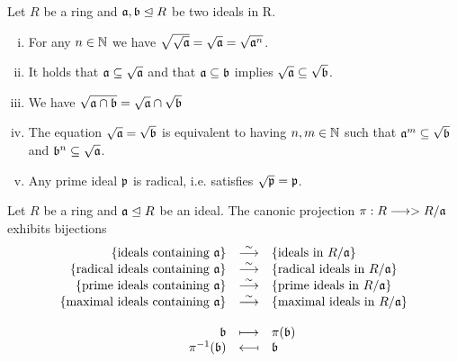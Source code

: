 	\begin{lemma}
		Let $R$ be a ring and $\mathfrak{a},\mathfrak{b} \trianglelefteq R$ be two ideals in R.
		\begin{enumerate}[(i)]
			\item{
				For any $n \in \mathbb{N}$ we have $\sqrt{\sqrt{\mathfrak{a}}} = \sqrt{\mathfrak{a}} = \sqrt{\mathfrak{a}^n}$.
			}
			\item{
				It holds that $\mathfrak{a} \subseteq \sqrt{\mathfrak{a}}$ and that $\mathfrak{a} \subseteq \mathfrak{b}$ implies $\sqrt{\mathfrak{a}} \subseteq \sqrt{\mathfrak{b}}$.
			}
			\item{
				We have $\sqrt{\mathfrak{a} \cap \mathfrak{b}} = \sqrt{\mathfrak{a}} \cap \sqrt{\mathfrak{b}}$
			}
			\item{
				The equation $\sqrt{\mathfrak{a}} = \sqrt{\mathfrak{b}}$ is equivalent to having $n,m \in \mathbb{N}$ such that $\mathfrak{a}^m \subseteq \sqrt{\mathfrak{b}}$ and $\mathfrak{b}^n \subseteq \sqrt{\mathfrak{a}}$.
			}
			\item{
				Any prime ideal $\mathfrak{p}$ is radical, i.e. satisfies $\sqrt{\mathfrak{p}} = \mathfrak{p}$.
			}
		\end{enumerate}
	\end{lemma}

	\begin{theorem}
		Let $R$ be a ring and $\mathfrak{a} \trianglelefteq R$ be an ideal. The canonic projection $\pi: R -->> R/\mathfrak{a}$ exhibits bijections
		\begin{equation*}
			\begin{array}{rcl}
				\{\text{ideals containing }\ideal{a}\} &\overset{\sim}{\longrightarrow} &\{\text{ideals in } R/\ideal{a}\}\\
				\{\text{radical ideals containing }\ideal{a}\} &\overset{\sim}{\longrightarrow} &\{\text{radical ideals in } R/\ideal{a}\}\\
				\{\text{prime ideals containing }\ideal{a}\} &\overset{\sim}{\longrightarrow} &\{\text{prime ideals in } R/\ideal{a}\}\\
				\{\text{maximal ideals containing }\ideal{a}\} &\overset{\sim}{\longrightarrow} &\{\text{maximal ideals in } R/\ideal{a}\}\\\\
				\ideal{b} &\longmapsto &\pi(\ideal{b})\\
				\pi^{-1}(\ideal{b}) &\reflectbox{$\longmapsto$} &\ideal{b}
			\end{array}
		\end{equation*}
	\end{theorem}

